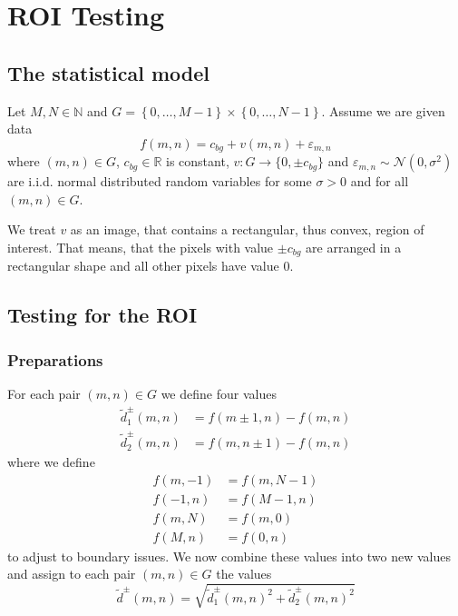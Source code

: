 \documentclass[a4paper,12pt]{article}
\theoremstyle{plain}
\theoremstyle{definition}
\theoremstyle{remark}
\begin{document}
\tableofcontents

\newpage

\section{ROI Testing}

\subsection{The statistical model}

Let $M, N \in \mathbb{N}$ and $G = \left\{ 0, \dots, M-1 \right\} \times  \left\{ 0, \dots, N-1 \right\}$. Assume we are given data
\begin{equation}\label{f}
	f(m, n) = c_{bg} + v(m, n) + \varepsilon_{m, n}
\end{equation}
where $(m, n) \in G$, $c_{bg} \in \mathbb{R}$ is constant, $v: G \to \{ 0, \pm c_{bg} \}$ and $\varepsilon_{m, n} \sim \mathcal{N}(0, \sigma^2)$ are i.i.d. normal distributed random variables for some $\sigma > 0$ and for all $(m, n) \in G$.

We treat $v$ as an image, that contains a rectangular, thus convex, region of interest. That means, that the pixels with value $\pm c_{bg}$ are arranged in a rectangular shape and all other pixels have value $0$.

\subsection{Testing for the ROI}

\subsubsection{Preparations}

For each pair $(m, n) \in G$ we define four values
\begin{align}
	\tilde{d}^\pm_1(m, n) &= f(m \pm 1, n) - f(m, n) \label{d1} \\
	\tilde{d}^\pm_2(m, n) &= f(m, n \pm 1) - f(m, n) \label{d2}
\end{align}
where we define
\begin{align*}
	f(m, -1) &= f(m, N-1) \\
	f(-1, n) &= f(M-1, n) \\
	f(m, N) &= f(m, 0) \\
	f(M, n) &= f(0, n)
\end{align*}
to adjust to boundary issues. We now combine these values into two new values and assign to each pair $(m, n) \in G$ the values
\begin{equation}\label{d_tilde}
	\tilde{d}^\pm(m, n) = \sqrt{\tilde{d}^\pm_1(m, n)^2 + \tilde{d}^\pm_2(m, n)^2}
\end{equation}
\end{document}
